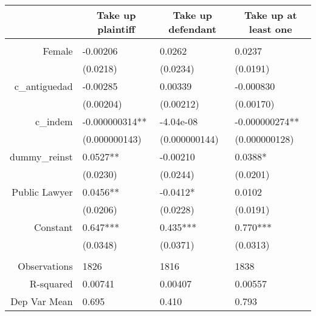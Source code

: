 \begin{tabular}{rrrr}
\toprule
      & \multicolumn{1}{c}{Take up plaintiff} & \multicolumn{1}{c}{Take up defendant} & \multicolumn{1}{c}{Take up at least one} \\
\midrule
      &       &       &  \\
Female & \multicolumn{1}{l}{-0.00206} & \multicolumn{1}{l}{0.0262} & \multicolumn{1}{l}{0.0237} \\
      & \multicolumn{1}{l}{(0.0218)} & \multicolumn{1}{l}{(0.0234)} & \multicolumn{1}{l}{(0.0191)} \\
c\_antiguedad & \multicolumn{1}{l}{-0.00285} & \multicolumn{1}{l}{0.00339} & \multicolumn{1}{l}{-0.000830} \\
      & \multicolumn{1}{l}{(0.00204)} & \multicolumn{1}{l}{(0.00212)} & \multicolumn{1}{l}{(0.00170)} \\
c\_indem & \multicolumn{1}{l}{-0.000000314**} & \multicolumn{1}{l}{-4.04e-08} & \multicolumn{1}{l}{-0.000000274**} \\
      & \multicolumn{1}{l}{(0.000000143)} & \multicolumn{1}{l}{(0.000000144)} & \multicolumn{1}{l}{(0.000000128)} \\
dummy\_reinst & \multicolumn{1}{l}{0.0527**} & \multicolumn{1}{l}{-0.00210} & \multicolumn{1}{l}{0.0388*} \\
      & \multicolumn{1}{l}{(0.0230)} & \multicolumn{1}{l}{(0.0244)} & \multicolumn{1}{l}{(0.0201)} \\
Public Lawyer & \multicolumn{1}{l}{0.0456**} & \multicolumn{1}{l}{-0.0412*} & \multicolumn{1}{l}{0.0102} \\
      & \multicolumn{1}{l}{(0.0206)} & \multicolumn{1}{l}{(0.0228)} & \multicolumn{1}{l}{(0.0191)} \\
Constant  & \multicolumn{1}{l}{0.647***} & \multicolumn{1}{l}{0.435***} & \multicolumn{1}{l}{0.770***} \\
      & \multicolumn{1}{l}{(0.0348)} & \multicolumn{1}{l}{(0.0371)} & \multicolumn{1}{l}{(0.0313)} \\
      & \multicolumn{1}{l}{} & \multicolumn{1}{l}{} & \multicolumn{1}{l}{} \\
Observations & \multicolumn{1}{l}{1826} & \multicolumn{1}{l}{1816} & \multicolumn{1}{l}{1838} \\
R-squared & \multicolumn{1}{l}{0.00741} & \multicolumn{1}{l}{0.00407} & \multicolumn{1}{l}{0.00557} \\
Dep Var Mean & \multicolumn{1}{l}{0.695} & \multicolumn{1}{l}{0.410} & \multicolumn{1}{l}{0.793} \\
\bottomrule
\end{tabular}%
